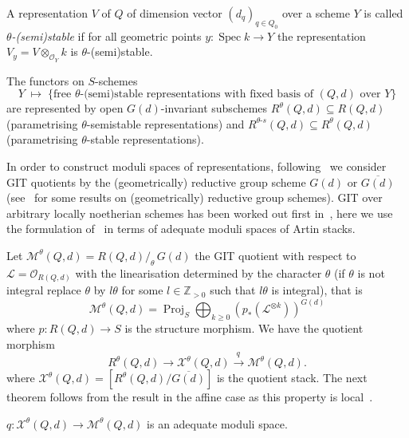 \documentclass[ALCO,ThmDefs,Unicode,epreuves]{cedram}
\def\Z{\mathds Z}
\def\O{\mathcal O}
\DeclareMathOperator{\Spec}{Spec}
\DeclareMathOperator{\Proj}{Proj}
\begin{document}
\begin{defi}
A representation $V$ of $Q$ of dimension vector $(d_q)_{q\in Q_0}$
over a scheme $Y$ is called {\it $\theta$-(semi)stable} if for all geometric points 
$y\colon\Spec k\to Y$ the representation $V_y=V\otimes_{\O_Y} k$ is 
$\theta$-(semi)stable.
\end{defi}

The functors on $S$-schemes 
\[
Y\;\mapsto\;\big\{\text{free $\theta$-(semi)stable representations with fixed 
basis of $(Q,d)$ over $Y$}\big\}
\]
are represented by open $G(d)$-invariant subschemes $R^\theta(Q,d)\!\subseteq\!R(Q,d)$
(parametrising $\theta$-semistable representations) and 
$R^{\theta\text{-}s}(Q,d)\!\subseteq\!R^\theta(Q,d)$ (parametrising $\theta$-stable
representations).


In order to construct moduli spaces of representations, following~\cite{Ki94} we 
consider GIT quotients by the (geometrically) reductive group scheme $G(d)$ or 
$\overline{G(d)}$ (see~ for some results on 
(geometrically) reductive group schemes). %
GIT over arbitrary locally noetherian schemes has been worked out first in~\cite{Ses77}, 
here we use the formulation of~\cite{Al14} in terms of adequate moduli spaces 
of Artin stacks.


Let $\mathcal M^\theta(Q,d)=R(Q,d)/_{\!\theta}\,G(d)$ 
the GIT quotient with respect to $\mathscr L=\O_{R(Q,d)}$ 
with the linearisation determined by the character $\theta$
(if $\theta$ is not integral replace $\theta$ by $l\theta$ for some $l\in\Z_{>0}$
such that $l\theta$ is integral), that is
\[\textstyle
\mathcal M^\theta(Q,d)
=\Proj_S\bigoplus_{k\geq 0}(p_*(\mathscr L^{\otimes k}))^{G(d)}
\]
where $p\colon R(Q,d)\to S$ is the structure morphism. We have the quotient morphism 
\[
R^\theta(Q,d)\to\mathcal X^\theta(Q,d)\stackrel{q\,}{\to}\mathcal M^\theta(Q,d).
\] 
where $\mathcal X^\theta(Q,d)=[R^\theta(Q,d)/\overline{G(d)}]$ is the 
quotient stack. The next theorem follows from the result in the affine case
\cite[Thm.~9.1.4]{Al14} as this property is local~\cite[Prop.~5.2.9]{Al14}.

\begin{theo}[\cite{Al14}]\label{thm:adequatemodulispace}
$q\colon\mathcal X^\theta(Q,d)\to\mathcal M^\theta(Q,d)$
is an adequate moduli space.
\end{theo}
\end{document}

